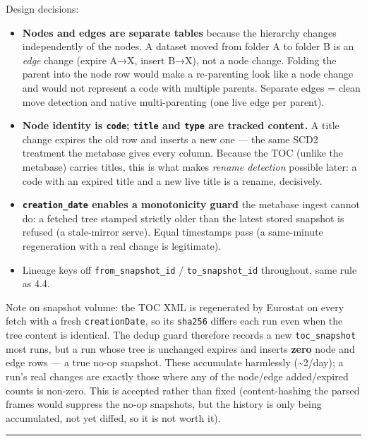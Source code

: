 \documentclass[
]{article}
\providecommand{\tightlist}{%
  \setlength{\itemsep}{0pt}\setlength{\parskip}{0pt}}
\begin{document}
Design decisions:

\begin{itemize}
\tightlist
\item
  \textbf{Nodes and edges are separate tables} because the hierarchy
  changes independently of the nodes. A dataset moved from folder A to
  folder B is an \emph{edge} change (expire A→X, insert B→X), not a node
  change. Folding the parent into the node row would make a re-parenting
  look like a node change and would not represent a code with multiple
  parents. Separate edges = clean move detection and native
  multi-parenting (one live edge per parent).
\item
  \textbf{Node identity is \texttt{code}; \texttt{title} and
  \texttt{type} are tracked content.} A title change expires the old row
  and inserts a new one --- the same SCD2 treatment the metabase gives
  every column. Because the TOC (unlike the metabase) carries titles,
  this is what makes \emph{rename detection} possible later: a code with
  an expired title and a new live title is a rename, decisively.
\item
  \textbf{\texttt{creation\_date} enables a monotonicity guard} the
  metabase ingest cannot do: a fetched tree stamped strictly older than
  the latest stored snapshot is refused (a stale-mirror serve). Equal
  timestamps pass (a same-minute regeneration with a real change is
  legitimate).
\item
  Lineage keys off \texttt{from\_snapshot\_id} /
  \texttt{to\_snapshot\_id} throughout, same rule as 4.4.
\end{itemize}

Note on snapshot volume: the TOC XML is regenerated by Eurostat on every
fetch with a fresh \texttt{creationDate}, so its \texttt{sha256} differs
each run even when the tree content is identical. The dedup guard
therefore records a new \texttt{toc\_snapshot} most runs, but a run
whose tree is unchanged expires and inserts \textbf{zero} node and edge
rows --- a true no-op snapshot. These accumulate harmlessly
(\textasciitilde2/day); a run's real changes are exactly those where any
of the node/edge added/expired counts is non-zero. This is accepted
rather than fixed (content-hashing the parsed frames would suppress the
no-op snapshots, but the history is only being accumulated, not yet
diffed, so it is not worth it).

\begin{center}\rule{0.5\linewidth}{0.5pt}\end{center}
\end{document}
